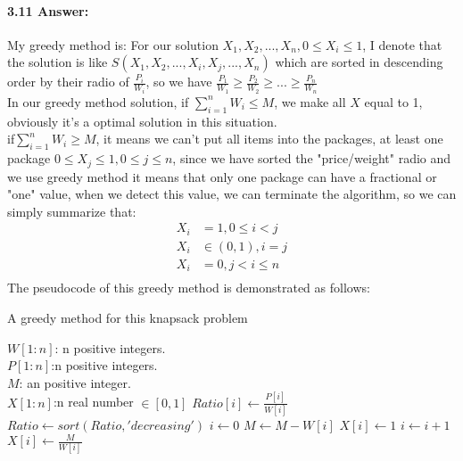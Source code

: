 \documentclass{article}
\begin{document}
	\paragraph{3.11 Answer:}
	My greedy method is:
	For our solution $X_1, X_2, ..., X_n, 0 \leq X_i \leq 1 $, I denote that the solution is like $S(X_1, X_2, ..., X_i, X_j, ..., X_n) $ which are sorted in descending order by their radio of $\frac{P_i}{W_i}$, so we have $\frac{P_1}{W_1} \geq \frac{P_2}{W_2} \geq ... \geq \frac{P_n}{W_n}$\\
	In our greedy method solution, if $\sum_{i=1}^{n} W_i \leq M$, we make all $X$ equal to 1, obviously it's a optimal solution in this situation.\\
	if$\sum_{i=1}^{n} W_i \geq M$, it means we can't put all items into the packages, at least one package $0 \leq X_j  \leq 1, 0 \leq j \leq n$, since we have sorted the "price/weight" radio and we use greedy method it means that only one package can have a fractional or "one" value, when we detect this value, we can terminate the algorithm, so we can simply summarize that:\\
	\begin{align*}
	X_i &= 1, 0 \leq i < j\\
	X_i &\in (0,1), i = j\\
	X_i &= 0, j < i \leq n\\
	\end{align*}
	The pseudocode of this greedy method is demonstrated as follows:
	\begin{algorithm}
		\caption{A greedy method for this knapsack problem}
		\begin{algorithmic}[1]
		 	\REQUIRE 
		 	$W[1:n]$: n positive integers.\\
		 			 $P[1:n]$:n positive integers.\\
		 			 $M$: an positive integer.\\
		 	\ENSURE $X[1:n] $:n real number $\in[0,1] $
		 	\STATE $Ratio[i] \gets\frac{P[i]}{W[i]}$
		 	\ENDFOR %
		 	\STATE $Ratio \gets sort(Ratio, 'decreasing')$
		 	\STATE $i\gets0$
		 	\STATE $M \gets M - W[i]$
		 	\STATE $X[i] \gets 1$
		 	\STATE $i \gets i + 1$
		 	\ELSE
		 	\STATE $X[i] \gets \frac{M}{W[i]}$
		 	\ENDIF %
		 	\ENDWHILE
		\end{algorithmic}
		\end{algorithm}
	\newpage
\end{document}
